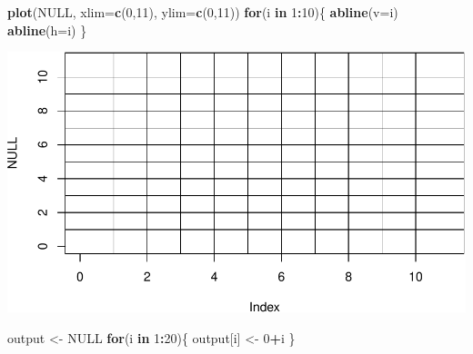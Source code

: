 \documentclass[]{article}
\newenvironment{Shaded}{\begin{snugshade}}{\end{snugshade}}
\newcommand{\KeywordTok}[1]{\textcolor[rgb]{0.13,0.29,0.53}{\textbf{#1}}}
\newcommand{\DataTypeTok}[1]{\textcolor[rgb]{0.13,0.29,0.53}{#1}}
\newcommand{\DecValTok}[1]{\textcolor[rgb]{0.00,0.00,0.81}{#1}}
\newcommand{\StringTok}[1]{\textcolor[rgb]{0.31,0.60,0.02}{#1}}
\newcommand{\OtherTok}[1]{\textcolor[rgb]{0.56,0.35,0.01}{#1}}
\newcommand{\ControlFlowTok}[1]{\textcolor[rgb]{0.13,0.29,0.53}{\textbf{#1}}}
\newcommand{\OperatorTok}[1]{\textcolor[rgb]{0.81,0.36,0.00}{\textbf{#1}}}
\newcommand{\NormalTok}[1]{#1}
\begin{document}
\begin{Shaded}
\begin{Highlighting}[]
\KeywordTok{plot}\NormalTok{(}\OtherTok{NULL}\NormalTok{, }\DataTypeTok{xlim=}\KeywordTok{c}\NormalTok{(}\DecValTok{0}\NormalTok{,}\DecValTok{11}\NormalTok{), }\DataTypeTok{ylim=}\KeywordTok{c}\NormalTok{(}\DecValTok{0}\NormalTok{,}\DecValTok{11}\NormalTok{))}
\ControlFlowTok{for}\NormalTok{(i }\ControlFlowTok{in} \DecValTok{1}\OperatorTok{:}\DecValTok{10}\NormalTok{)\{}
  \KeywordTok{abline}\NormalTok{(}\DataTypeTok{v=}\NormalTok{i)}
  \KeywordTok{abline}\NormalTok{(}\DataTypeTok{h=}\NormalTok{i)}
\NormalTok{\}}
\end{Highlighting}
\end{Shaded}

\includegraphics{Lab4_Matrix_Algebra_Functions_files/figure-latex/for2-2.pdf}

\begin{Shaded}
\begin{Highlighting}[]
\NormalTok{output <-}\StringTok{ }\OtherTok{NULL}
\ControlFlowTok{for}\NormalTok{(i }\ControlFlowTok{in} \DecValTok{1}\OperatorTok{:}\DecValTok{20}\NormalTok{)\{}
\NormalTok{  output[i] <-}\StringTok{ }\DecValTok{0}\OperatorTok{+}\NormalTok{i}
\NormalTok{\}}
\end{Highlighting}
\end{Shaded}
\end{document}
